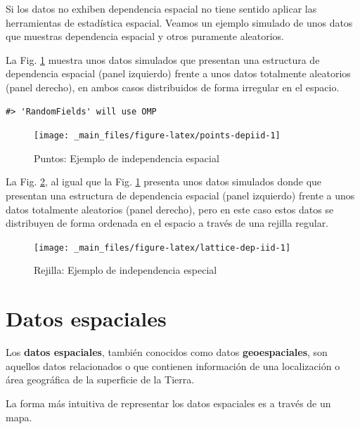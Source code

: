 \documentclass[
]{book}
\begin{document}
Si los datos no exhiben dependencia espacial no tiene sentido aplicar las
herramientas de estadística espacial. Veamos un ejemplo simulado de unos datos
que muestras dependencia espacial y otros puramente aleatorios.

La Fig. \ref{fig:points-depiid} muestra unos datos simulados que presentan una
estructura de dependencia espacial (panel izquierdo) frente a unos datos
totalmente aleatorios (panel derecho), en ambos casos distribuidos de forma
irregular en el espacio.

\begin{verbatim}
#> 'RandomFields' will use OMP
\end{verbatim}

\begin{figure}

{\centering \texttt{[image: \_main\_files/figure-latex/points-depiid-1]} 

}

\caption{Puntos: Ejemplo de independencia espacial}\label{fig:points-depiid}
\end{figure}

La Fig. \ref{fig:lattice-dep-iid}, al igual que la Fig.
\ref{fig:points-depiid} presenta unos datos simulados donde que presentan una
estructura de dependencia espacial (panel izquierdo) frente a unos datos
totalmente aleatorios (panel derecho), pero en este caso estos datos se
distribuyen de forma ordenada en el espacio a través de una rejilla regular.

\begin{figure}

{\centering \texttt{[image: \_main\_files/figure-latex/lattice-dep-iid-1]} 

}

\caption{Rejilla: Ejemplo de independencia especial}\label{fig:lattice-dep-iid}
\end{figure}

\hypertarget{datos-espaciales}{%
\section{Datos espaciales}\label{datos-espaciales}}

Los \textbf{datos espaciales}, también conocidos como datos \textbf{geoespaciales}, son
aquellos datos relacionados o que contienen información de una localización o
área geográfica de la superficie de la Tierra.

La forma más intuitiva de representar los datos espaciales es a través de un
mapa.
\end{document}
